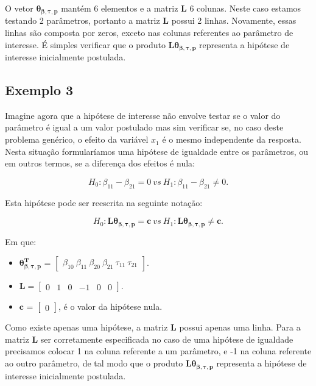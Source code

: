 O vetor $\boldsymbol{\theta_{\beta,\tau,p}}$ mantém 6 elementos e a matriz $\boldsymbol{L}$ 6 colunas. Neste caso estamos testando 2 parâmetros, portanto a matriz $\boldsymbol{L}$ possui 2 linhas. Novamente, essas linhas são composta por zeros, exceto nas colunas referentes ao parâmetro de interesse. É simples verificar que o produto $\boldsymbol{L}\boldsymbol{\theta_{\beta,\tau,p}}$ representa a hipótese de interesse inicialmente postulada.

\subsection{Exemplo 3}

Imagine agora que a hipótese de interesse não envolve testar se o valor do parâmetro é igual a um valor postulado mas sim verificar se, no caso deste problema genérico, o efeito da variável $x_1$ é o mesmo independente da resposta. Nesta situação formularíamos uma hipótese de igualdade entre os parâmetros, ou em outros termos, se a diferença dos efeitos é nula:

\begin{equation}
H_0: \beta_{11} - \beta_{21} = 0 \ vs \ H_1: \beta_{11} - \beta_{21} \neq 0.
\end{equation}

Esta hipótese pode ser reescrita na seguinte notação:

$$H_0: \boldsymbol{L}\boldsymbol{\theta_{\beta,\tau,p}} = \boldsymbol{c} \ vs \ H_1: \boldsymbol{L}\boldsymbol{\theta_{\beta,\tau,p}} \neq \boldsymbol{c}.$$ 

Em que:

\begin{itemize}
  
  \item $\boldsymbol{\theta_{\beta,\tau,p}^T}$ = $\begin{bmatrix} \beta_{10} \  \beta_{11} \ \beta_{20} \ \beta_{21} \ \tau_{11} \ \tau_{21} \end{bmatrix}$.


\item $\boldsymbol{L} = \begin{bmatrix} 0 & 1 & 0 & -1 & 0 & 0  \end{bmatrix}.$
 
\item $\boldsymbol{c}$ = $\begin{bmatrix} 0 \end{bmatrix}$, é o valor da hipótese nula. 

\end{itemize}

Como existe apenas uma hipótese, a matriz $\boldsymbol{L}$ possui apenas uma linha. Para a matriz $\boldsymbol{L}$ ser corretamente especificada no caso de uma hipótese de igualdade precisamos colocar 1 na coluna referente a um parâmetro, e -1 na coluna referente ao outro parâmetro, de tal modo que o produto $\boldsymbol{L}\boldsymbol{\theta_{\beta,\tau,p}}$ representa a hipótese de interesse inicialmente postulada.


